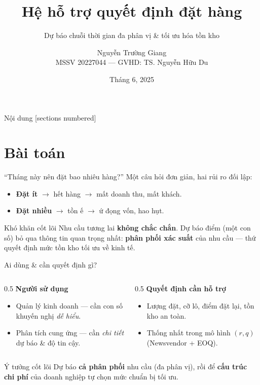 \documentclass[aspectratio=169,11pt]{beamer}
\title{Hệ hỗ trợ quyết định đặt hàng}
\subtitle{Dự báo chuỗi thời gian đa phân vị \& tối ưu hóa tồn kho}
\author{Nguyễn Trường Giang \\ \small MSSV 20227044 --- GVHD: TS. Nguyễn Hữu Du}
\institute{Đại học Bách khoa Hà Nội --- Khoa Toán -- Tin\\ \textit{Đồ án 1}}
\date{Tháng 6, 2025}
\begin{document}
\maketitle

\begin{frame}{Nội dung}
  [sections numbered]
  \tableofcontents[hideallsubsections]
\end{frame}

\section{Bài toán}

\begin{frame}{``Tháng này nên đặt bao nhiêu hàng?''}
  Một câu hỏi đơn giản, hai rủi ro đối lập:
  \begin{itemize}
    \item \textbf{Đặt ít} $\rightarrow$ hết hàng $\rightarrow$ mất doanh thu, mất khách.
    \item \textbf{Đặt nhiều} $\rightarrow$ tồn ế $\rightarrow$ ứ đọng vốn, hao hụt.
  \end{itemize}
  \vfill
  \begin{alertblock}{Khó khăn cốt lõi}
    Nhu cầu tương lai \textbf{không chắc chắn}. Dự báo điểm (một con số) bỏ qua
    thông tin quan trọng nhất: \textbf{phân phối xác suất} của nhu cầu --- thứ
    quyết định mức tồn kho tối ưu về kinh tế.
  \end{alertblock}
\end{frame}

\begin{frame}{Ai dùng \& cần quyết định gì?}
  \begin{columns}[T]
    \begin{column}{0.5\textwidth}
      \textbf{Người sử dụng}
      \begin{itemize}
        \item Quản lý kinh doanh --- cần con số khuyến nghị \emph{dễ hiểu}.
        \item Phân tích cung ứng --- cần \emph{chi tiết} dự báo \& độ tin cậy.
      \end{itemize}
    \end{column}
    \begin{column}{0.5\textwidth}
      \textbf{Quyết định cần hỗ trợ}
      \begin{itemize}
        \item Lượng đặt, cỡ lô, điểm đặt lại, tồn kho an toàn.
        \item Thống nhất trong mô hình \textbf{$(r,q)$} (Newsvendor + EOQ).
      \end{itemize}
    \end{column}
  \end{columns}
  \vfill
  \begin{block}{Ý tưởng cốt lõi}
    Dự báo \textbf{cả phân phối} nhu cầu (đa phân vị), rồi để \textbf{cấu trúc chi
    phí} của doanh nghiệp tự chọn mức chuẩn bị tối ưu.
  \end{block}
\end{frame}
\end{document}
